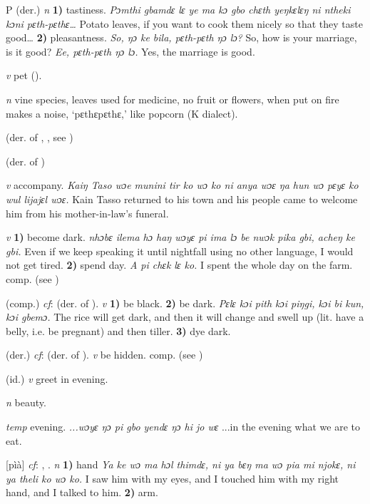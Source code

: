 \begin{letter}{P}
 (der.) \textit{n} \textbf{1)} tastiness. \textit{Pɔmthi gbamdɛ lɛ ye ma kɔ gbo chɛth yeŋkɛlɛŋ ni ntheki kɔni pɛth-pɛthɛ…} Potato leaves, if you want to cook them nicely so that they taste good… \textbf{2)} pleasantness. \textit{So, ŋɔ ke bila, pɛth-pɛth ŋɔ lɔ?} So, how is your marriage, is it good? \textit{Ee, pɛth-pɛth ŋɔ lɔ.} Yes, the marriage is good. 

 \textit{v} pet (\citealt{Pichl1967}). 

 \textit{n} vine species, leaves used for medicine, no fruit or flowers, when put on fire makes a noise, ‘pɛthɛpɛthɛ,' like popcorn (K dialect).

 (der. of , , see ) 

 (der. of ) 

 \textit{v} accompany. \textit{Kaiŋ Taso wɔe munini tir ko wɔ ko ni anya wɔɛ ŋa hun wɔ pɛyɛ ko wul lijajɛl wɔɛ.} Kain Tasso returned to his town and his people came to welcome him from his mother-in-law's funeral.

 \textit{v} \textbf{1)} become dark. \textit{nhɔbɛ ilema hɔ haŋ wɔyɛ pi ima lɔ be nwɔk pika gbi, acheŋ ke gbi.} Even if we keep speaking it until nightfall using no other language, I would not get tired. \textbf{2)} spend day. \textit{A pi chɛk lɛ ko.} I spent the whole day on the farm. comp.  (see ) 

 (comp.) \textit{cf}:  (der. of ). \textit{v} \textbf{1)} be black. \textbf{2)} be dark. \textit{Pɛlɛ kɔi pith kɔi piŋgi, kɔi bi kun, kɔi gbemɔ.} The rice will get dark, and then it will change and swell up (lit. have a belly, i.e. be pregnant) and then tiller. \textbf{3)} dye dark.

 (der.) \textit{cf}:  (der. of ). \textit{v} be hidden. comp.  (see )

 (id.) \textit{v} greet in evening.

 \textit{n} beauty.

 \textit{temp} evening. \textit{...wɔyɛ ŋɔ pi gbo yendɛ ŋɔ hi jo wɛ} ...in the evening what we are to eat.

 [pìà] \textit{cf}: , . \textit{n} \textbf{1)} hand \textit{Ya ke wɔ ma hɔl thimdɛ, ni ya bɛŋ ma wɔ pia mi njokɛ, ni ya theli ko wɔ ko.} I saw him with my eyes, and I touched him with my right hand, and I talked to him. \textbf{2)} arm.


\end{letter}
